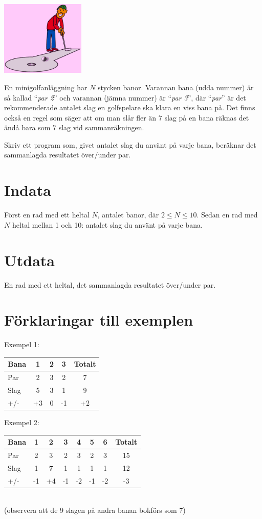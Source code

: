 
\begin{center}
\includegraphics[width=0.3\textwidth]{minigolfbild.pdf}
\end{center}

En minigolfanläggning har $N$ stycken banor. Varannan bana (udda nummer) är så kallad ``{\em par 2}'' och
varannan (jämna nummer) är ``{\em par 3}'', där ``{\em par}'' är det rekommenderade antalet slag en golfspelare ska klara
en viss bana på. Det finns också en regel som säger att om man slår fler än $7$ slag på en bana räknas det ändå
bara som $7$ slag vid sammanräkningen.

Skriv ett program som, givet antalet slag du använt på varje bana, beräknar det sammanlagda resultatet över/under par. 

\section*{Indata}
Först en rad med ett heltal $N$, antalet banor, där $2\le N\le 10$. Sedan en rad med $N$ heltal mellan 1 och 10: antalet slag du använt på varje bana.

\section*{Utdata}
En rad med ett heltal, det sammanlagda resultatet över/under par.

\section*{Förklaringar till exemplen}
Exempel 1:\\
\begin{tabular}{||l|c|c|c||c||}\hline \hline
Bana & 1 & 2 & 3 & Totalt \\ \hline \hline
Par & 2 & 3 & 2 & 7 \\ \hline 
Slag & 5 & 3 & 1 & 9 \\ \hline
+/- & +3 & 0 & -1 & +2 \\ \hline \hline
\end{tabular}

Exempel 2:\\
\begin{tabular}{||l|c|c|c|c|c|c||c||}\hline \hline
Bana & 1 & 2 & 3 & 4 & 5 & 6 & Totalt \\ \hline \hline
Par & 2 & 3 & 2 & 3 & 2 & 3 & 15 \\ \hline 
Slag & 1 & {\bf 7} & 1 & 1 & 1 & 1 & 12 \\ \hline
+/- & -1 & +4 & -1 & -2 & -1 & -2 & -3\\ \hline \hline
\end{tabular}\\
(observera att de 9 slagen på andra banan bokförs som 7)

